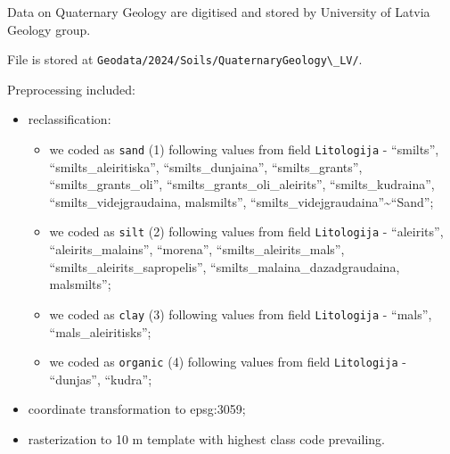 \documentclass[
]{book}
\newcommand{\passthrough}[1]{#1}
\begin{document}
Data on Quaternary Geology are digitised and stored by University of Latvia
Geology group.

File is stored at \passthrough{\lstinline!Geodata/2024/Soils/QuaternaryGeology\_LV/!}.

Preprocessing included:

\begin{itemize}
\item
  reclassification:

  \begin{itemize}
  \item
    we coded as \passthrough{\lstinline!sand!} (1) following values from field \passthrough{\lstinline!Litologija!} - ``smilts'', ``smilts\_aleiritiska'',
    ``smilts\_dunjaina'', ``smilts\_grants'', ``smilts\_grants\_oli'', ``smilts\_grants\_oli\_aleirits'', ``smilts\_kudraina'',
    ``smilts\_videjgraudaina, malsmilts'', ``smilts\_videjgraudaina''\textasciitilde{}``Sand'';
  \item
    we coded as \passthrough{\lstinline!silt!} (2) following values from field \passthrough{\lstinline!Litologija!} - ``aleirits'', ``aleirits\_malains'',
    ``morena'', ``smilts\_aleirits\_mals'', ``smilts\_aleirits\_sapropelis'', ``smilts\_malaina\_dazadgraudaina, malsmilts'';
  \item
    we coded as \passthrough{\lstinline!clay!} (3) following values from field \passthrough{\lstinline!Litologija!} - ``mals'', ``mals\_aleiritisks'';
  \item
    we coded as \passthrough{\lstinline!organic!} (4) following values from field \passthrough{\lstinline!Litologija!} - ``dunjas'', ``kudra'';
  \end{itemize}
\item
  coordinate transformation to epsg:3059;
\item
  rasterization to 10 m template with highest class code prevailing.
\end{itemize}
\end{document}
